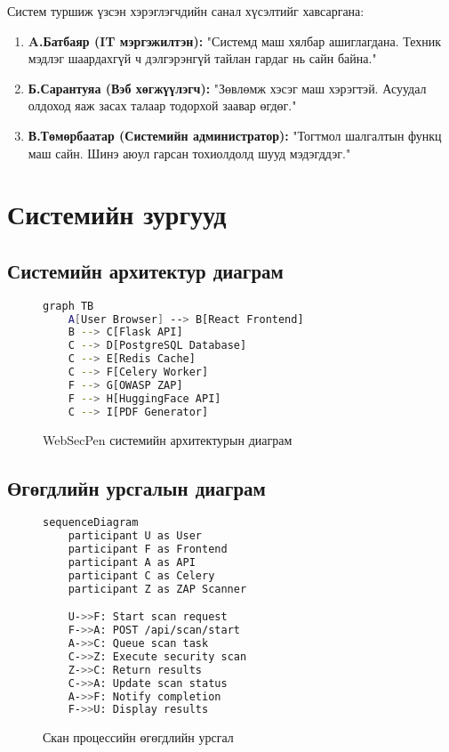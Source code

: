 \documentclass[main.tex]{subfiles}
\begin{document}
Систем туршиж үзсэн хэрэглэгчдийн санал хүсэлтийг хавсаргана:

\begin{enumerate}
    \item \textbf{A.Батбаяр (IT мэргэжилтэн):} 
    "Системд маш хялбар ашиглагдана. Техник мэдлэг шаардахгүй ч дэлгэрэнгүй тайлан гардаг нь сайн байна."
    
    \item \textbf{Б.Сарантуяа (Вэб хөгжүүлэгч):}
    "Зөвлөмж хэсэг маш хэрэгтэй. Асуудал олдоход яаж засах талаар тодорхой заавар өгдөг."
    
    \item \textbf{В.Төмөрбаатар (Системийн администратор):}
    "Тогтмол шалгалтын функц маш сайн. Шинэ аюул гарсан тохиолдолд шууд мэдэгддэг."
\end{enumerate}

\chapter{Системийн зургууд}

\section{Системийн архитектур диаграм}

\begin{figure}[h]
\centering
\begin{lstlisting}[language=bash, caption=Системийн архитектурын диаграм]
graph TB
    A[User Browser] --> B[React Frontend]
    B --> C[Flask API]
    C --> D[PostgreSQL Database]
    C --> E[Redis Cache]
    C --> F[Celery Worker]
    F --> G[OWASP ZAP]
    F --> H[HuggingFace API]
    C --> I[PDF Generator]
\end{lstlisting}
\caption{WebSecPen системийн архитектурын диаграм}
\end{figure}

\section{Өгөгдлийн урсгалын диаграм}

\begin{figure}[h]
\centering
\begin{lstlisting}[language=bash, caption=Өгөгдлийн урсгалын диаграм]
sequenceDiagram
    participant U as User
    participant F as Frontend
    participant A as API
    participant C as Celery
    participant Z as ZAP Scanner

    U->>F: Start scan request
    F->>A: POST /api/scan/start
    A->>C: Queue scan task
    C->>Z: Execute security scan
    Z->>C: Return results
    C->>A: Update scan status
    A->>F: Notify completion
    F->>U: Display results
\end{lstlisting}
\caption{Скан процессийн өгөгдлийн урсгал}
\end{figure}
\end{document}
